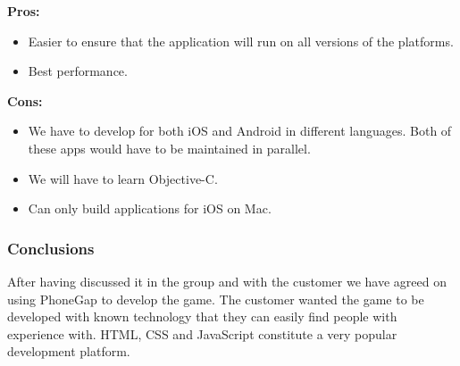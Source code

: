 \indent
  {\bf Pros:}
  \begin{itemize}
    \item Easier to ensure that the application will run on all versions of
          the platforms.
    \item Best performance.
  \end{itemize}

\indent
  {\bf Cons:}
  \begin{itemize}
    \item We have to develop for both iOS and Android in different languages.
          Both of these apps would have to be maintained in parallel.
    \item We will have to learn Objective-C.
    \item Can only build applications for iOS on Mac.
  \end{itemize}

\noindent
\subsubsection{Conclusions}
After having discussed it in the group and with the customer we have agreed
on using PhoneGap to develop the game. The customer wanted the game to
be developed with known technology that they can easily find people with
experience with. HTML, CSS and JavaScript constitute a very popular development
platform.
